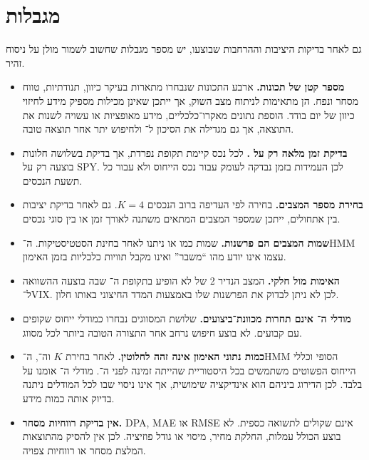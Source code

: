 \section{מגבלות}

גם לאחר בדיקות היציבות וההרחבות שבוצעו, יש מספר מגבלות שחשוב לשמור מולן על ניסוח זהיר.

\begin{itemize}
    \item \textbf{מספר קטן של תכונות.} ארבע התכונות שנבחרו מתארות בעיקר כיוון, תנודתיות, טווח מסחר ונפח. הן מתאימות לניתוח מצב השוק, אך ייתכן שאינן מכילות מספיק מידע לחיזוי כיוון של יום בודד. הוספת נתונים מאקרו־כלכליים, מידע מאופציות או  עשויה לשנות את התוצאה, אך גם מגדילה את הסיכון ל־ ולחיפוש יתר אחר תוצאה טובה.

    \item \textbf{בדיקת זמן מלאה רק על .} לכל נכס קיימת תקופת  נפרדת, אך בדיקת  בשלושה חלונות בוצעה רק על SPY. לכן העמידות בזמן נבדקה לעומק עבור נכס הייחוס ולא עבור כל תשעת הנכסים.

    \item \textbf{בחירת מספר המצבים.} בחירה לפי  העדיפה ברוב הנכסים \(K=4\). גם לאחר בדיקת יציבות בין אתחולים, ייתכן שמספר המצבים המתאים משתנה לאורך זמן או בין סוגי נכסים.

    \item \textbf{שמות המצבים הם פרשנות.} שמות כמו  או  ניתנו לאחר בחינת הסטטיסטיקות. ה־HMM עצמו אינו יודע מהו ``משבר'' ואינו מקבל תוויות כלכליות בזמן האימון.

    \item \textbf{האימות מול  חלקי.} המצב הנדיר 2 של  לא הופיע בתקופת ה־ שבה בוצעה ההשוואה ל־VIX. לכן לא ניתן לבדוק את הפרשנות שלו באמצעות המדד החיצוני באותו חלון.

    \item \textbf{מודלי ה־ אינם תחרות מכוונת־ביצועים.} שלושת המסווגים נבחרו כמודלי ייחוס שקופים עם  קבועים. לא בוצע חיפוש נרחב אחר התצורה הטובה ביותר לכל מסווג.

    \item \textbf{כמות נתוני האימון אינה זהה לחלוטין.} לאחר בחירת \(K\) וה־, ה־HMM הסופי וכללי הייחוס הפשוטים משתמשים בכל היסטוריית  שהייתה זמינה לפני ה־. מודלי ה־ אומנו על  בלבד. לכן הדירוג ביניהם הוא אינדיקציה שימושית, אך אינו ניסוי שבו לכל המודלים ניתנה בדיוק אותה כמות מידע.

    \item \textbf{אין בדיקת רווחיות מסחר.} DPA, MAE או RMSE אינם שקולים לתשואה כספית. לא בוצע  הכולל עמלות, החלקת מחיר, מיסוי או גודל פוזיציה. לכן אין להסיק מהתוצאות המלצת מסחר או רווחיות צפויה.
\end{itemize}

